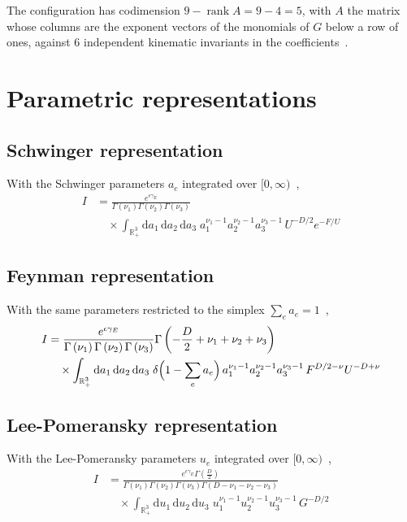 \documentclass[11pt,a4paper]{article}
\begin{document}
The configuration has codimension $9 - \operatorname{rank} A = 9 - 4 = 5$, with $A$ the matrix whose columns are the exponent vectors of the monomials of $G$ below a row of ones, against 6 independent kinematic invariants in the coefficients~\cite{klausen2023}.

\section{Parametric representations}
\subsection{Schwinger representation}
With the Schwinger parameters $a_e$ integrated over $[0, \infty)$~\cite{weinzierl2022},
\begin{equation*}
\begin{split}
I &= \frac{e^{\epsilon \gamma_{E}}}{\Gamma\left(\nu_{1}\right) \Gamma\left(\nu_{2}\right) \Gamma\left(\nu_{3}\right)} \\
&\quad \times \int_{\mathbb{R}_{+}^{3}} \mathrm{d}a_{1}\, \mathrm{d}a_{2}\, \mathrm{d}a_{3}\; a_{1}^{\nu_{1} - 1} a_{2}^{\nu_{2} - 1} a_{3}^{\nu_{3} - 1}\, U^{- D / 2} e^{- F / U}
\end{split}
\end{equation*}
\subsection{Feynman representation}
With the same parameters restricted to the simplex $\sum_e a_e = 1$~\cite{weinzierl2022},
\begin{equation*}
\begin{split}
I &= \frac{e^{\epsilon \gamma_{E}}}{\Gamma\left(\nu_{1}\right) \Gamma\left(\nu_{2}\right) \Gamma\left(\nu_{3}\right)} \Gamma\left(- \frac{D}{2} + \nu_{1} + \nu_{2} + \nu_{3}\right) \\
&\quad \times \int_{\mathbb{R}_{+}^{3}} \mathrm{d}a_{1}\, \mathrm{d}a_{2}\, \mathrm{d}a_{3}\; \delta\Bigl(1 - \sum_{e} a_{e}\Bigr)\, a_{1}^{\nu_{1} - 1} a_{2}^{\nu_{2} - 1} a_{3}^{\nu_{3} - 1}\, F^{D / 2 - \nu} U^{- D + \nu}
\end{split}
\end{equation*}
\subsection{Lee-Pomeransky representation}
With the Lee-Pomeransky parameters $u_e$ integrated over $[0, \infty)$~\cite{leepomeransky2013},
\begin{equation*}
\begin{split}
I &= \frac{e^{\epsilon \gamma_{E}} \Gamma\left(\frac{D}{2}\right)}{\Gamma\left(\nu_{1}\right) \Gamma\left(\nu_{2}\right) \Gamma\left(\nu_{3}\right) \Gamma\left(D - \nu_{1} - \nu_{2} - \nu_{3}\right)} \\
&\quad \times \int_{\mathbb{R}_{+}^{3}} \mathrm{d}u_{1}\, \mathrm{d}u_{2}\, \mathrm{d}u_{3}\; u_{1}^{\nu_{1} - 1} u_{2}^{\nu_{2} - 1} u_{3}^{\nu_{3} - 1}\, G^{- D / 2}
\end{split}
\end{equation*}
\end{document}
